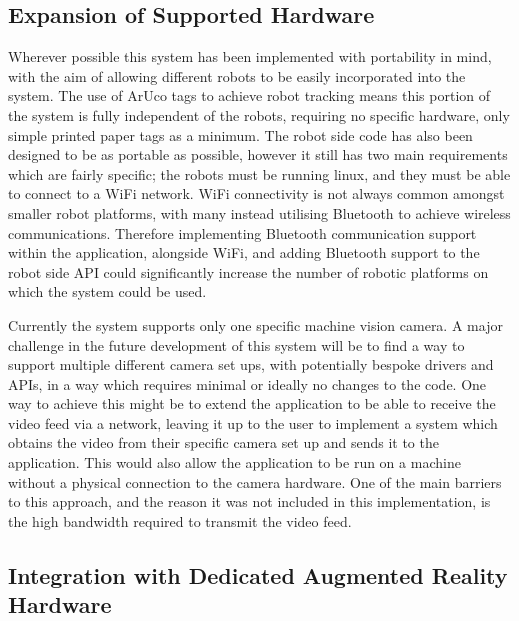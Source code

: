 
\subsection{Expansion of Supported Hardware}

Wherever possible this system has been implemented with portability in mind, with the aim of allowing different robots to be easily incorporated into the system. The use of ArUco tags to achieve robot tracking means this portion of the system is fully independent of the robots, requiring no specific hardware, only simple printed paper tags as a minimum. The robot side code has also been designed to be as portable as possible, however it still has two main requirements which are fairly specific; the robots must be running linux, and they must be able to connect to a WiFi network. WiFi connectivity is not always common amongst smaller robot platforms, with many instead utilising Bluetooth to achieve wireless communications. Therefore implementing Bluetooth communication support within the application, alongside WiFi, and adding Bluetooth support to the robot side API could significantly increase the number of robotic platforms on which the system could be used.

Currently the system supports only one specific machine vision camera. A major challenge in the future development of this system will be to find a way to support multiple different camera set ups, with potentially bespoke drivers and APIs, in a way which requires minimal or ideally no changes to the code. One way to achieve this might be to extend the application to be able to receive the video feed via a network, leaving it up to the user to implement a system which obtains the video from their specific camera set up and sends it to the application. This would also allow the application to be run on a machine without a physical connection to the camera hardware. One of the main barriers to this approach, and the reason it was not included in this implementation, is the high bandwidth required to transmit the video feed.


\subsection{Integration with Dedicated Augmented Reality Hardware}

